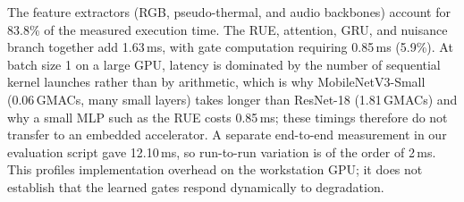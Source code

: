 \documentclass[journal]{IEEEtran}
\begin{document}
\begin{table}[!t]
\centering
\caption[Per-module inference latency of AdapFuse-v1]{Per-module inference latency of AdapFuse-v1 (batch 1, workstation GPU)}
\label{tab:latency_profile}
\end{table}

The feature extractors (RGB, pseudo-thermal, and audio backbones) account for 83.8\% of the measured execution time. The RUE, attention, GRU, and nuisance branch together add 1.63\,ms, with gate computation requiring 0.85\,ms (5.9\%). At batch size 1 on a large GPU, latency is dominated by the number of sequential kernel launches rather than by arithmetic, which is why MobileNetV3-Small (0.06\,GMACs, many small layers) takes longer than ResNet-18 (1.81\,GMACs) and why a small MLP such as the RUE costs 0.85\,ms; these timings therefore do not transfer to an embedded accelerator. A separate end-to-end measurement in our evaluation script gave 12.10\,ms, so run-to-run variation is of the order of 2\,ms. This profiles implementation overhead on the workstation GPU; it does not establish that the learned gates respond dynamically to degradation.
\end{document}
